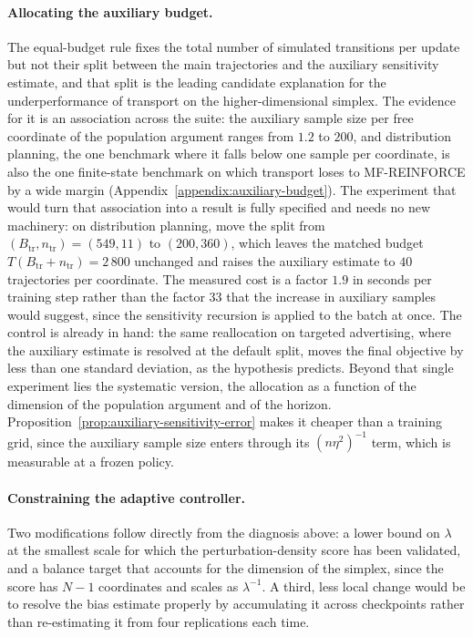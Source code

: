 \paragraph{Allocating the auxiliary budget.}
The equal-budget rule fixes the total number of simulated transitions per update but not their split between the main trajectories and the auxiliary sensitivity estimate, and that split is the leading candidate explanation for the underperformance of transport on the higher-dimensional simplex. The evidence for it is an association across the suite: the auxiliary sample size per free coordinate of the population argument ranges from $1.2$ to $200$, and distribution planning, the one benchmark where it falls below one sample per coordinate, is also the one finite-state benchmark on which transport loses to MF-REINFORCE by a wide margin (Appendix~\ref{appendix:auxiliary-budget}). The experiment that would turn that association into a result is fully specified and needs no new machinery: on distribution planning, move the split from $(B_{\mathrm{tr}},n_{\mathrm{tr}})=(549,11)$ to $(200,360)$, which leaves the matched budget $T(B_{\mathrm{tr}}+n_{\mathrm{tr}})=2\,800$ unchanged and raises the auxiliary estimate to $40$ trajectories per coordinate. The measured cost is a factor $1.9$ in seconds per training step rather than the factor $33$ that the increase in auxiliary samples would suggest, since the sensitivity recursion is applied to the batch at once. The control is already in hand: the same reallocation on targeted advertising, where the auxiliary estimate is resolved at the default split, moves the final objective by less than one standard deviation, as the hypothesis predicts. Beyond that single experiment lies the systematic version, the allocation as a function of the dimension of the population argument and of the horizon. Proposition~\ref{prop:auxiliary-sensitivity-error} makes it cheaper than a training grid, since the auxiliary sample size enters through its $(n\eta^2)^{-1}$ term, which is measurable at a frozen policy.

\paragraph{Constraining the adaptive controller.}
Two modifications follow directly from the diagnosis above: a lower bound on $\lambda$ at the smallest scale for which the perturbation-density score has been validated, and a balance target that accounts for the dimension of the simplex, since the score has $N-1$ coordinates and scales as $\lambda^{-1}$. A third, less local change would be to resolve the bias estimate properly by accumulating it across checkpoints rather than re-estimating it from four replications each time.

